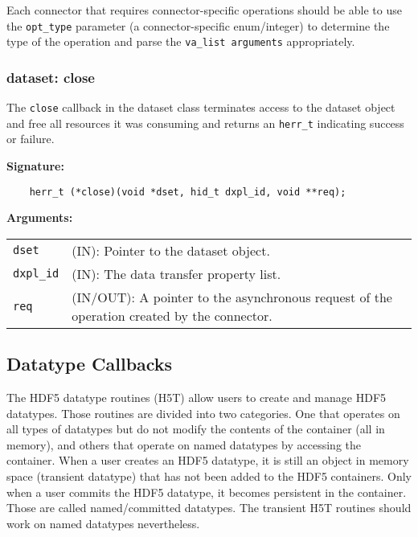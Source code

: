 Each connector that requires connector-specific operations should be able to use the \texttt{opt\_type} parameter (a connector-specific enum/integer) to determine the type of the operation and parse the \texttt{va\_list arguments} appropriately.

\subsubsection{dataset: close}
The \texttt{close} callback in the dataset class terminates access
to the dataset object and free all resources it was consuming and
returns an \texttt{herr\_t} indicating success or failure.\bigskip

\begin{mdframed}[style=bgbox]
\textbf{Signature:}
\begin{lstlisting}
    herr_t (*close)(void *dset, hid_t dxpl_id, void **req);
\end{lstlisting}

\textbf{Arguments:}\\
\begin{tabular}{l p{13.5cm}}
  \texttt{dset} & (IN): Pointer to the dataset object.\\
  \texttt{dxpl\_id} & (IN): The data transfer property list.\\
  \texttt{req} & (IN/OUT): A pointer to the asynchronous request of the
  operation created by the connector.\\
\end{tabular}
\end{mdframed}


\subsection{Datatype Callbacks}
The HDF5 datatype routines (H5T) allow users to create and manage HDF5
datatypes. Those routines are divided into two categories. One that
operates on all types of datatypes but do not modify the contents of
the container (all in memory), and others that operate on named
datatypes by accessing the container. When a user creates an HDF5
datatype, it is still an object in memory space (transient datatype)
that has not been added to the HDF5 containers. Only when a user
commits the HDF5 datatype, it becomes persistent in the
container. Those are called named/committed datatypes. The transient
H5T routines should work on named datatypes nevertheless. 

